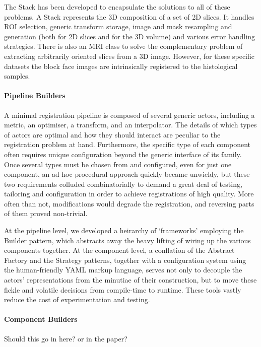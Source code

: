         The Stack has been developed to encapsulate the solutions to all of these problems. A Stack represents the 3D composition of a set of 2D slices. It handles ROI selection, generic transform storage, image and mask resampling and generation (both for 2D slices and for the 3D volume) and various error handling strategies. There is also an MRI class to solve the complementary problem of extracting arbitrarily oriented slices from a 3D image. However, for these specific datasets the block face images are intrinsically registered to the histological samples.
  
      \paragraph{Pipeline Builders}
        A minimal registration pipeline is composed of several generic actors, including a metric, an optimiser, a transform, and an interpolator. The details of which types of actors are optimal and how they should interact are peculiar to the registration problem at hand. Furthermore, the specific type of each component often requires unique configuration beyond the generic interface of its family. Once several types must be chosen from and configured, even for just one component, an ad hoc procedural approach quickly became unwieldy, but these two requirements colluded combinatorially to demand a great deal of testing, tailoring and configuration in order to achieve registrations of high quality. More often than not, modifications would degrade the registration, and reversing parts of them proved non-trivial.

        At the pipeline level, we developed a heirarchy of `frameworks' employing the Builder pattern, which abstracts away the heavy lifting of wiring up the various components together.  At the component level, a conflation of the Abstract Factory and the Strategy patterns, together with a configuration system using the human-friendly YAML markup language, serves not only to decouple the actors' representations from the minutiae of their construction, but to move these fickle and volatile decisions from compile-time to runtime. These tools vastly reduce the cost of experimentation and testing.
      
      \paragraph{Component Builders}
      Should this go in here? or in the paper? 
      
